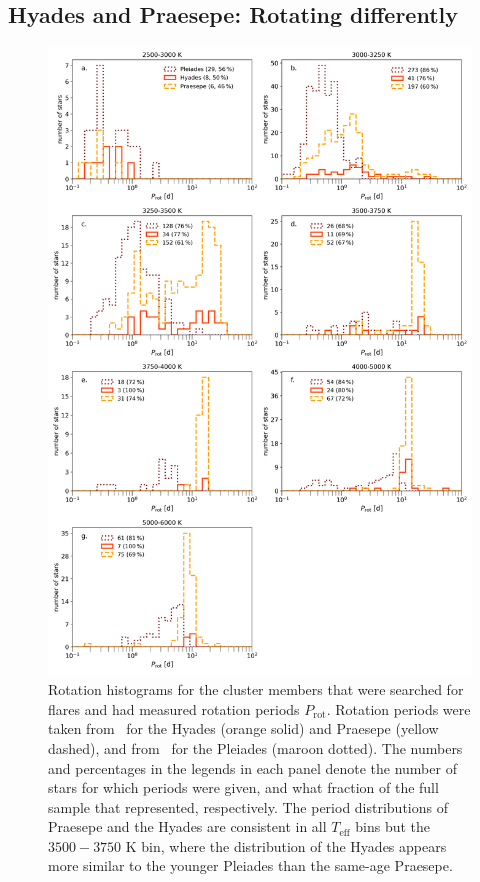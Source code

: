 \documentclass{aa}
\begin{document}
\subsection{Hyades and Praesepe: Rotating differently}
   \begin{figure}
   \centering
            \includegraphics[width=.85\hsize]{pics/rotation/SpT_wise_rotation.png}
         \caption{Rotation histograms for the cluster members that were searched for flares and had measured rotation periods $P_\mathrm{rot}$. Rotation periods were taken from~\citet{douglas2019} for the Hyades (orange solid) and Praesepe (yellow dashed), and from~\citet{rebull_pleiadesrot_2016} for the Pleiades (maroon dotted). The numbers and percentages in the legends in each panel denote the number of stars for which periods were given, and what fraction of the full sample that represented, respectively. The period distributions of Praesepe and the Hyades are consistent in all $T_\mathrm{eff}$ bins but the $3500-3750$ K bin, where the distribution of the Hyades appears more similar to the younger Pleiades than the same-age Praesepe.}
          \label{fig:rotation_histogram}
   \end{figure}
\end{document}
